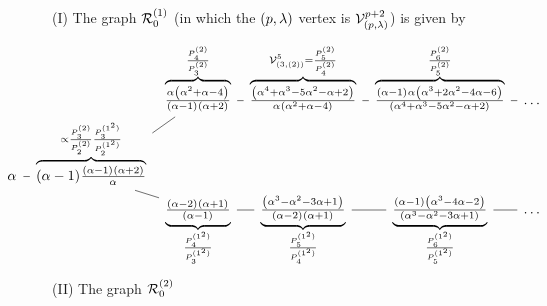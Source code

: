 
\begin{proposition}\label{pr:l0}
(I) The graph ${\mathcal{R}}^{(1)}_0 $ 
(in which the $(p,\lambda)$ vertex is ${\mathcal V}^{p+2}_{(p,\lambda)}$)
is given by      %
\[ \hspace{-1.5cm} 
\begin{tikzcd}[row sep=0em,column sep=0.5em]
&&
\overbrace{
\tfrac{\alpha^{} \left(\alpha^2+\alpha -4\right)^{}}{(\alpha -1)^{} (\alpha +2)^{}} }^{ \frac{P^{(2)}_{4}}{P^{(2)}_{3}} }  \ar[r,dash]
  &
  \overbrace{
  \tfrac{\left(\alpha^4+\alpha^3-5 \alpha^2-\alpha +2\right)^{}}{\alpha^{} \left(\alpha ^2+\alpha -4\right)^{}}}^{ \V^{5}_{(3,(2))} = \frac{P^{(2)}_{5}}{P^{(2)}_{4}}} \ar[r,dash]
  &
  \overbrace{
  \tfrac{(\alpha -1)^{} \alpha^{} \left(\alpha ^3+2 \alpha ^2-4 \alpha -6\right)^{}}{\left(\alpha ^4+\alpha ^3-5 \alpha ^2-\alpha +2\right)^{}} }^{\frac{P^{(2)}_{6}}{P^{(2)}_{5}} \ppm{}}   \ar[r,dash]&
  \dots
\\
\alpha^{}\ar[r,dash] &
  \overbrace{
 (\alpha-1)^{} \tfrac{(\alpha-1)^{} (\alpha+2)^{}}{\alpha^{}}    }^{ \propto \frac{P^{(2)}_{3}}{P^{(2)}_{2}} \frac{P^{(1^2)}_{3}}{P^{(1^2)}_{2}}  }    \ar[ur,dash]\ar[dr,dash]
    \\
    &&
    \underbrace{
    \tfrac{(\alpha -2)^{} (\alpha +1)^{}}{(\alpha -1)^{}}  }_{ \frac{P^{(1^2)}_{4}}{P^{(1^2)}_{3}}  }  \ar[r,dash]
      &
      \underbrace{
    \tfrac{\left(\alpha ^3-\alpha ^2-3 \alpha +1\right)^{}}{(\alpha -2)^{} (\alpha +1)^{}} }_{\frac{P^{(1^2)}_{5}}{P^{(1^2)}_{4}}} \ar[r,dash]
    &
    \underbrace{
    \tfrac{(\alpha -1)^{} \left(\alpha ^3-4 \alpha -2\right)^{}}{\left(\alpha ^3-\alpha ^2-3 \alpha +1\right)^{}} }_{\frac{P^{(1^2)}_{\ppmm{6}}}{P^{(1^2)}_{5}}} \ar[r,dash]&\dots
\end{tikzcd}
\]
%
(II) The graph ${\mathcal{R}}^{(2)}_0 $ 
\end{proposition}
